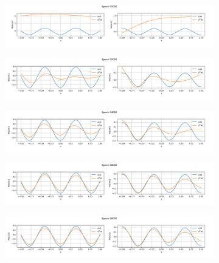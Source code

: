 \begin{figure}[h!]
    \centering
    \begin{subfigure}[b]{0.85\textwidth}
        \includegraphics[width=\textwidth]{img/evolution_randinit/sol-00000.png}
    \end{subfigure}
    \vfill
    \begin{subfigure}[b]{0.85\textwidth}
        \includegraphics[width=\textwidth]{img/evolution_randinit/sol-02000.png}
    \end{subfigure}
    \vfill
    \begin{subfigure}[b]{0.85\textwidth}
        \includegraphics[width=\textwidth]{img/evolution_randinit/sol-04000.png}
    \end{subfigure}
    \vfill
    \begin{subfigure}[b]{0.85\textwidth}
        \includegraphics[width=\textwidth]{img/evolution_randinit/sol-08000.png}
    \end{subfigure}
    \vfill
    \begin{subfigure}[b]{0.85\textwidth}
        \includegraphics[width=\textwidth]{img/evolution_randinit/sol-08000.png}

\end{subfigure}
\end{figure}
